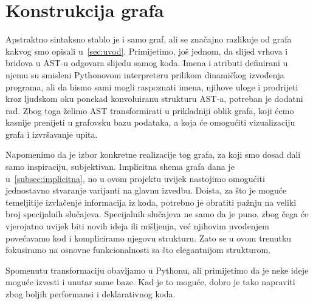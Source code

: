 \section{Konstrukcija grafa}
Apstraktno sintaksno stablo je i samo graf, ali se značajno razlikuje od grafa
kakvog smo opisali u~\ref{sec:uvod}. Primijetimo, još jednom, da
slijed vrhova i bridova u AST-u odgovara slijedu samog koda. Imena i atributi
definirani u njemu su smisleni Pythonovom interpreteru prilikom
dinamičkog izvođenja programa, ali da bismo sami mogli raspoznati imena,
njihove uloge i prodrijeti kroz ljudskom oku ponekad konvoluiranu strukturu AST-a,
potreban je dodatni rad. Zbog toga želimo AST transformirati u 
prikladniji oblik grafa, koji ćemo kasnije prenijeti u grafovsku bazu podataka, a
koja će omogućiti vizualizaciju grafa i izvršavanje upita.

Napomenimo da je izbor konkretne realizacije tog grafa, za koji smo dosad
dali samo inspiraciju, subjektivan. Implicitna shema grafa dana je u~\ref{subsec:implicitna}, 
no u ovom projektu uvijek nastojimo omogućiti jednostavno stvaranje varijanti na glavnu
izvedbu. Doista, za što je moguće temeljitije izvlačenje informacija
iz koda, potrebno je obratiti pažnju na veliki broj specijalnih slučajeva.
Specijalnih slučajeva ne samo da je puno, zbog čega će vjerojatno
uvijek biti novih ideja ili mišljenja, već njihovim uvođenjem
povećavamo kod i kompliciramo njegovu strukturu. Zato se u ovom
trenutku fokusiramo na osnovne funkcionalnosti sa što
elegantnijom strukturom.

Spomenutu transformaciju obavljamo u Pythonu, ali primijetimo
da je neke ideje moguće izvesti i unutar same baze. Kad je to moguće,
dobro je tako napraviti zbog boljih performansi i deklarativnog koda.

